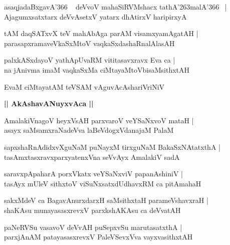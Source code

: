 \documentclass[twoside,12pt,openright]{book}
\def\S{\char'263}
\newcounter{shloka}[chapter]
\def\uvaca#1{\centerline{{\large\textbf{#1}}}}
\begin{document}
\begin{shloka}%
asaqjadaBxgavA\char'366 ~ deVvoV mahaSiRVMshacx tathA\S malA\char'366 ~|\\
Ajagumxsatxtarx deVvAsetxV yatarx dhAtirxV haripirxyA
\end{shloka}

\begin{shloka}%
tAM daqSATxvX teV mahAbAga parAM visamxyamAgatAH |\\
parasapxramaveVkaSxMtoV vaqkaSxdashaRnalAlasAH
\end{shloka}

\begin{shloka}%
palxkASxdayoV yathApUvaRM vititasavxravx Eva ca |\\
na jAnivma imaM vaqkaSxMa ciMtayaMtoVbisaMsithxtAH 
\end{shloka}

\begin{shloka}%
EvaM ciMtayatAM teVSAM vAguvAcAshariVriNiV
\end{shloka}

\uvaca{|| AkAshavANuyxvAca ||}

\begin{shloka}%
AmalakiVnagoV heyxVsAH parxvaroV veYSaNxvoV mataH |\\
asayx saMsamxraNadeVva laBeVdogxVdanajaM PalaM 
\end{shloka}

\begin{shloka}%
sapxshaRnAdidxvXguNaM puNayxM tirxguNaM BakaSxNAtatxthA |\\
tasAmxtasxravxparxyatenxVna seVvAyx AmalakiV sadA 
\end{shloka}

\begin{shloka}%
saravxpApaharA porxVkatx veYSaNxviV papanAshiniV |\\
tasAyx mUleV sithxtoV viSuNxsatxdUdhavxRM ca pitAmahaH
\end{shloka}

\begin{shloka}%
sakxMdeV ca BagavAnurxdarxH saMsithxtaH parameVshavxraH |\\
shaKAsu munayasasxrevxV parxkshAKAsu ca deVvatAH 
\end{shloka}

\begin{shloka}%
paNeRVSu vasavoV deVvAH puSepxvSu marutasatxthA |\\
parxjAnAM patayasasxrevxV PaleVSevxVva vayxvasithxtAH 
\end{shloka}
\end{document}

